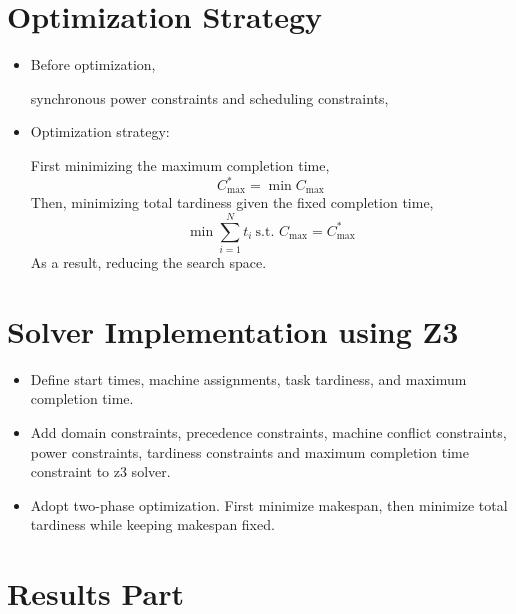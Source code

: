 \documentclass{article}
\begin{document}
\section{Optimization Strategy}
\begin{itemize}
  \item Before optimization,

  
synchronous power constraints and scheduling constraints,


\item Optimization strategy:


First minimizing the maximum completion time,
\[
C_{\max}^* = \min C_{\max}
\]
Then, minimizing total tardiness given the fixed completion time,
\[
\min \sum_{i=1}^{N} t_i  \ \text{s.t. } C_{\max} = C_{\max}^*
\]
As a result, reducing the search space.
\end{itemize}

\section{Solver Implementation using Z3}

\begin{itemize}
  \item Define start times, machine assignments, task tardiness, and maximum completion time.
  \item Add domain constraints, precedence constraints, machine conflict constraints, power constraints, tardiness constraints and maximum completion time constraint to z3 solver.
  \item Adopt two-phase optimization. First minimize makespan, then minimize total tardiness while keeping makespan fixed.

\end{itemize}

\section{Results Part}
\end{document}
